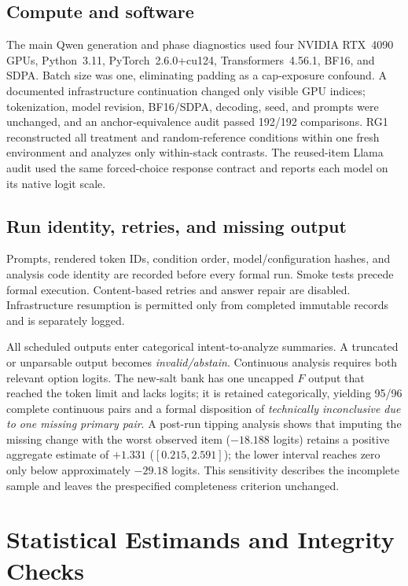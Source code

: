 \documentclass[letterpaper]{article}
\begin{document}
\subsection{Compute and software}

The main Qwen generation and phase diagnostics used four NVIDIA RTX~4090 GPUs, Python~3.11, PyTorch~2.6.0+cu124, Transformers~4.56.1, BF16, and SDPA.  Batch size was one, eliminating padding as a cap-exposure confound.  A documented infrastructure continuation changed only visible GPU indices; tokenization, model revision, BF16/SDPA, decoding, seed, and prompts were unchanged, and an anchor-equivalence audit passed 192/192 comparisons.  RG1 reconstructed all treatment and random-reference conditions within one fresh environment and analyzes only within-stack contrasts.  The reused-item Llama audit used the same forced-choice response contract and reports each model on its native logit scale.

\subsection{Run identity, retries, and missing output}

Prompts, rendered token IDs, condition order, model/configuration hashes, and analysis code identity are recorded before every formal run.  Smoke tests precede formal execution.  Content-based retries and answer repair are disabled.  Infrastructure resumption is permitted only from completed immutable records and is separately logged.

All scheduled outputs enter categorical intent-to-analyze summaries.  A truncated or unparsable output becomes \emph{invalid/abstain}.  Continuous analysis requires both relevant option logits.  The new-salt bank has one uncapped $F$ output that reached the token limit and lacks logits; it is retained categorically, yielding 95/96 complete continuous pairs and a formal disposition of \emph{technically inconclusive due to one missing primary pair}.  A post-run tipping analysis shows that imputing the missing change with the worst observed item ($-18.188$ logits) retains a positive aggregate estimate of $+1.331$ ($[0.215,2.591]$); the lower interval reaches zero only below approximately $-29.18$ logits.  This sensitivity describes the incomplete sample and leaves the prespecified completeness criterion unchanged.

\section{Statistical Estimands and Integrity Checks}
\label{supp:inference}
\end{document}
